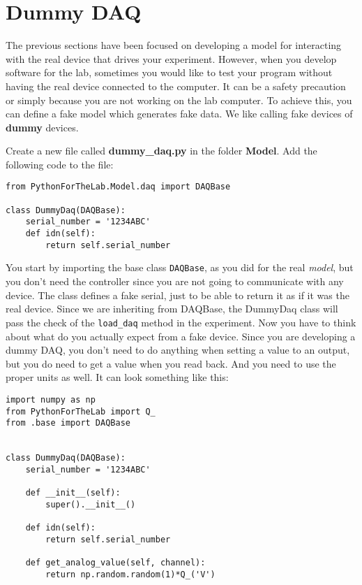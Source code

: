 {\section{Dummy DAQ}\label{dummy-daq}
The previous sections have been focused on developing a model for interacting with the real device that drives your experiment. However, when you develop software for the lab, sometimes you would like to test your program without having the real device connected to the computer. It can be a safety precaution or simply because you are not working on the lab computer. To achieve this, you can define a fake model which generates fake data. We like calling fake devices of \textbf{dummy} devices. 

Create a new file called \textbf{dummy\_daq.py} in the folder \textbf{Model}. Add the following code to the file:

\begin{verbatim}
from PythonForTheLab.Model.daq import DAQBase

class DummyDaq(DAQBase):
    serial_number = '1234ABC'
    def idn(self):
        return self.serial_number
\end{verbatim}

You start by importing the base class \texttt{DAQBase}, as you did for the real \emph{model}, but you don't need the controller since you are not going to communicate with any device. The class defines a fake serial, just to be able to return it as if it was the real device. Since we are inheriting from DAQBase, the DummyDaq class will pass the check of the \texttt{load_daq} method in the experiment. Now you have to think about what do you actually expect from a fake device. Since you are developing a dummy {DAQ}, you don't need to do anything when setting a value to an output, but you do need to get a value when you read back. And you need to use the proper units as well. It can look something like this:

\begin{verbatim}
import numpy as np
from PythonForTheLab import Q_
from .base import DAQBase


class DummyDaq(DAQBase):
    serial_number = '1234ABC'
    
    def __init__(self):
        super().__init__()
    
    def idn(self):
        return self.serial_number
    
    def get_analog_value(self, channel):
        return np.random.random(1)*Q_('V')


\end{verbatim}}
